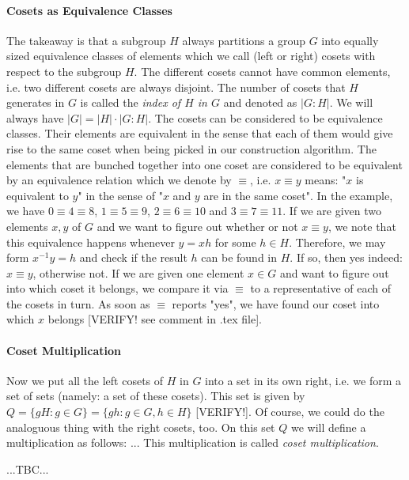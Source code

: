 \paragraph{Cosets as Equivalence Classes}
The takeaway is that a subgroup $H$ always partitions a group $G$ into equally sized equivalence classes of elements which we call (left or right) cosets with respect to the subgroup $H$. The different cosets cannot have common elements, i.e. two different cosets are always disjoint. The number of cosets that $H$ generates in $G$ is called the \emph{index of $H$ in $G$} and denoted as $|G : H|$. We will always have $|G| = |H| \cdot |G : H|$. The cosets can be considered to be equivalence classes. Their elements are equivalent in the sense that each of them would give rise to the same coset when being picked in our construction algorithm. The elements that are bunched together into one coset are considered to be equivalent by an equivalence relation which we denote by $\equiv$, i.e. $x \equiv y$ means: "$x$ is equivalent to $y$" in the sense of "$x$ and $y$ are in the same coset". In the example, we have $0 \equiv 4 \equiv 8$, $1 \equiv 5 \equiv 9$, $2 \equiv 6 \equiv 10$ and $3 \equiv 7 \equiv 11$. If we are given two elements $x,y$ of $G$ and we want to figure out whether or not $x \equiv y$, we note that this equivalence happens whenever $y = x h$ for some $h \in H$. Therefore, we may form $x^{-1} y = h$ and check if the result $h$ can be found in $H$. If so, then yes indeed: $x \equiv y$, otherwise not. If we are given one element $x \in G$ and want to figure out into which coset it belongs, we compare it via $\equiv$ to a representative of each of the cosets in turn. As soon as $\equiv$ reports "yes", we have found our coset into which $x$ belongs [VERIFY! see comment in .tex file].

\paragraph{Coset Multiplication} Now we put all the left cosets of $H$ in $G$ into a set in its own right, i.e. we form a set of sets (namely: a set of these cosets). This set is given by $Q = \{ g H : g \in G \} =  \{ g h : g \in G, h \in H \}$ [VERIFY!]. Of course, we could do the analoguous thing with the right cosets, too. On this set $Q$ we will define a multiplication as follows: ... This multiplication is called \emph{coset multiplication}. 

...TBC...



